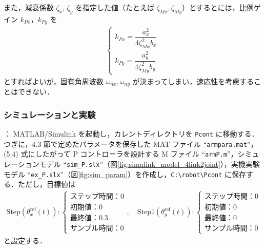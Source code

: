 また，減衰係数 $\zeta_x$, $\zeta_y$ を指定した値（たとえば $\zeta_{Mx}, \zeta_{My}$）とするとには，比例ゲイン $k_{Px}$，$k_{Py}$ を
\begin{align}
    \begin{cases}
        k_{Px} = \dfrac{a_x^2}{4\zeta_{Mx}^2 b_x} \\
        k_{Py} = \dfrac{a_y^2}{4\zeta_{My}^2 b_y}
    \end{cases}
    \tag{5.5}
\end{align}
とすればよいが，固有角周波数 $\omega_{nx}, \omega_{ny}$ が決まってしまい，速応性を考慮することはできない．

\subsubsection{シミュレーションと実験}

\noindent
{}：
MATLAB/Simulink を起動し，カレントディレクトリを \texttt{\textyen Pcont} に移動する．つぎに，4.3 節で定めたパラメータを保存した MAT ファイル ``\texttt{armpara.mat}''，(5.4) 式にしたがって P コントローラを設計する M ファイル ``\texttt{armP.m}''，シミュレーションモデル ``\texttt{sim\_P.slx}''（図\ref{fig:simulink_model_4link2joint}），実機実験モデル ``\texttt{ex\_P.slx}''（図\ref{fig:sim_param}）を作成し，\texttt{C:\textbackslash robot\textbackslash Pcont} に保存する．ただし，目標値は
\begin{align}
    \mathrm{Step}\left(\theta_x^{\mathrm{ref}}(t)\right)\colon
    \begin{cases}
        \text{ステップ時間：}0 \\
        \text{初期値：}0 \\
        \text{最終値：}0.3 \\
        \text{サンプル時間：}0
    \end{cases}
    ,\quad
    \mathrm{Step1}\left(\theta_y^{\mathrm{ref}}(t)\right)\colon
    \begin{cases}
        \text{ステップ時間：}0 \\
        \text{初期値：}0 \\
        \text{最終値：}0 \\
        \text{サンプル時間：}0
    \end{cases}
    \tag{5.6}
\end{align}
と設定する．

